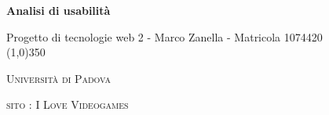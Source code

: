 \documentclass[a4paper,12pt]{article}
\author{Marco Zanella}
\date{17/05/2016}
\begin{document}
\begin{titlepage}
	\centering
	{\huge\bfseries Analisi di usabilità \par}
	Progetto di tecnologie web 2 - Marco Zanella - Matricola 1074420 \\
	\line(1,0){350} \\
	{\scshape\LARGE Università di Padova \par}
	\vspace{1cm}
	{\scshape\Large sito : I Love Videogames \par}
	\logo
\end{titlepage}
	
	\newpage
	\pagestyle{myfront}
		\newpage
			\tableofcontents
		\newpage
			\listoffigures
	\label{LastFrontPage}

	\newpage
		\pagestyle{mymain}
	\newpage
		
	\newpage
		
	\newpage
		
	\newpage
		
	\newpage
		
	\newpage
		
	\newpage
		
				
	\label{LastPage}
\end{document}
